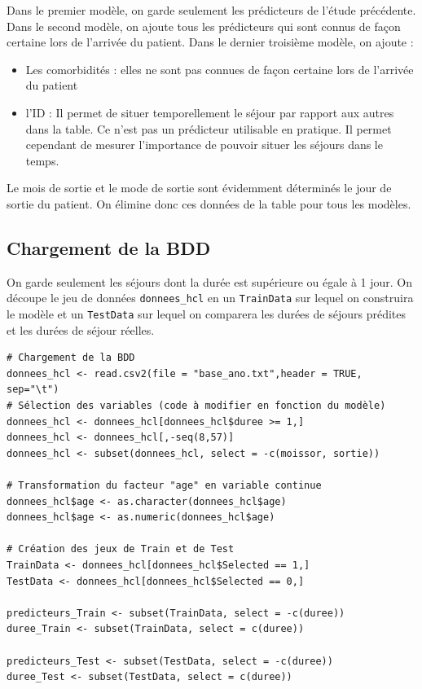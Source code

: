 \documentclass[a4paper,11pt]{article}
\begin{document}
Dans le premier modèle, on garde seulement les prédicteurs de l'étude précédente. Dans le second modèle, on ajoute tous les prédicteurs qui sont connus de façon certaine lors de l'arrivée du patient.
\newline
\newline
Dans le dernier troisième modèle, on ajoute :
\begin{itemize}
\item Les comorbidités : elles ne sont pas connues de façon certaine lors de l'arrivée du patient
\item l'ID : Il permet de situer temporellement  le séjour par rapport aux autres dans la table. Ce n'est pas un prédicteur utilisable en pratique. Il permet cependant de mesurer l'importance de pouvoir situer les séjours dans le temps.
\end{itemize}
Le mois de sortie et le mode de sortie sont évidemment déterminés le jour de sortie du patient. On élimine donc ces données de la table pour tous les modèles.

\subsection{Chargement de la BDD}
On garde seulement les séjours dont la durée est supérieure ou égale à 1 jour. On découpe le jeu de données \texttt{donnees\_hcl} en un \texttt{TrainData} sur lequel on construira le modèle et un \texttt{TestData} sur lequel on comparera les durées de séjours prédites et les durées de séjour réelles.
\begin{lstlisting}
# Chargement de la BDD
donnees_hcl <- read.csv2(file = "base_ano.txt",header = TRUE, sep="\t")
# Sélection des variables (code à modifier en fonction du modèle)
donnees_hcl <- donnees_hcl[donnees_hcl$duree >= 1,]
donnees_hcl <- donnees_hcl[,-seq(8,57)]
donnees_hcl <- subset(donnees_hcl, select = -c(moissor, sortie))

# Transformation du facteur "age" en variable continue
donnees_hcl$age <- as.character(donnees_hcl$age)
donnees_hcl$age <- as.numeric(donnees_hcl$age)

# Création des jeux de Train et de Test
TrainData <- donnees_hcl[donnees_hcl$Selected == 1,]
TestData <- donnees_hcl[donnees_hcl$Selected == 0,]

predicteurs_Train <- subset(TrainData, select = -c(duree))
duree_Train <- subset(TrainData, select = c(duree))

predicteurs_Test <- subset(TestData, select = -c(duree))
duree_Test <- subset(TestData, select = c(duree))
\end{lstlisting}
\end{document}
